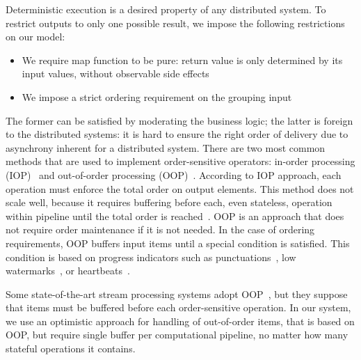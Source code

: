 \label {fs-collision}

Deterministic execution is a desired property of any distributed system. 
%
To restrict outputs to only one possible result, we impose the following  restrictions on our model: 

\begin{itemize}
  \item We require map function to be pure: return value is only determined by its input values, without observable side effects
  \item We impose a strict ordering requirement on the grouping  input
\end{itemize}

The former   can be  satisfied by moderating the  business logic; 
the latter  is foreign to the distributed systems: 
it is hard to ensure  the right order of delivery due to  asynchrony inherent for a distributed system. 
There are two most common methods that are used to implement order-sensitive operators: in-order processing (IOP)~\cite{Arasu:2006:CCQ:1146461.1146463, Cranor:2003:GSD:872757.872838} and out-of-order processing (OOP)~\cite{Li:2008:OPN:1453856.1453890}. According to IOP approach, each operation must enforce the total order on output elements. This method does not scale well, because it requires buffering before each, even stateless, operation within pipeline until the total order is reached~\cite{Li:2008:OPN:1453856.1453890}. OOP is an approach that does not require order maintenance if it is not needed. In the case of ordering requirements, OOP buffers input items until a special condition is satisfied. This condition is based on progress indicators such as punctuations~\cite{Tucker:2003:EPS:776752.776780}, low watermarks~\cite{Akidau:2013:MFS:2536222.2536229}, or heartbeats~\cite{Srivastava:2004:FTM:1055558.1055596}.  

Some state-of-the-art stream processing systems adopt OOP~\cite{Carbone:2017:SMA:3137765.3137777}, but they suppose that items must be buffered before each order-sensitive operation. In our system, we use an optimistic approach for handling of out-of-order items, that is based on OOP, but require single buffer per computational pipeline, no matter how many stateful operations it contains.
%
%

